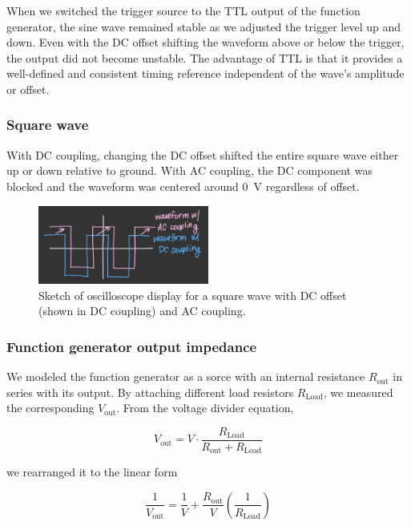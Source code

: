 \documentclass{article}
\begin{document}
\noindent When we switched the trigger source to the TTL output of the function generator, the sine wave remained stable as we adjusted the trigger level up and down. Even with the DC offset shifting the waveform above or below the trigger, the output did not become unstable. The advantage of TTL is that it provides a well-defined and consistent timing reference independent of the wave's amplitude or offset.

\subsubsection{Square wave}

With DC coupling, changing the DC offset shifted the entire square wave either up or down relative to ground. With AC coupling, the DC component was blocked and the waveform was centered around \SI{0}{\volt} regardless of offset.

\begin{figure}[H]
    \centering
    \includegraphics[width=0.5\textwidth]{DC offset.png}
    \caption{Sketch of oscilloscope display for a square wave with DC offset (shown in DC coupling) and AC coupling.}
    \label{fig:my_label}
\end{figure}

\subsubsection{Function generator output impedance}

We modeled the function generator as a sorce with an internal resistance $R_\text{out}$ in series with its output. By attaching different load resistors $R_\text{Load}$, we measured the corresponding $V_\text{out}$. From the voltage divider equation,

\begin{equation}
    V_\text{out}=V\cdot \frac{R_\text{Load}}{R_\text{out}+R_\text{Load}}
\end{equation}

we rearranged it to the linear form

\begin{equation}
    \frac{1}{V_\text{out}}=\frac{1}{V}+\frac{R_\text{out}}{V}\left( \frac{1}{R_\text{Load}}\right)
\end{equation}
\end{document}
